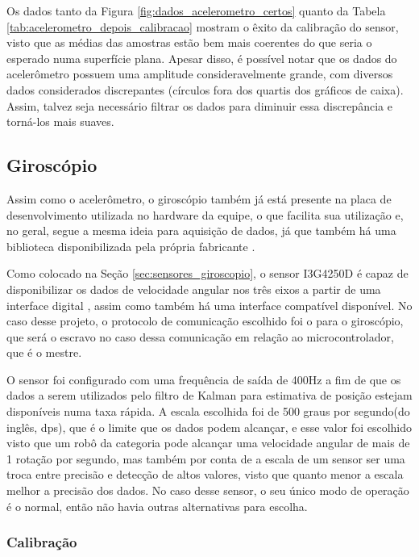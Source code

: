 \documentclass[acronym, symbols, table]{fei}
\begin{document}
					Os dados tanto da Figura \ref{fig:dados_acelerometro_certos} quanto da Tabela \ref{tab:acelerometro_depois_calibracao} mostram o êxito da calibração do sensor, visto que as médias das amostras estão bem mais coerentes do que seria o esperado numa superfície plana. Apesar disso, é possível notar que os dados do acelerômetro possuem uma amplitude consideravelmente grande, com diversos dados considerados discrepantes (círculos fora dos quartis dos gráficos de caixa). Assim, talvez seja necessário filtrar os dados para diminuir essa discrepância e torná-los mais suaves.
			
			\subsection{Giroscópio}
			
				Assim como o acelerômetro, o giroscópio também já está presente na placa de desenvolvimento utilizada no hardware da equipe, o que facilita sua utilização e, no geral, segue a mesma ideia para aquisição de dados, já que também há uma biblioteca disponibilizada pela própria fabricante \cite{gyro_repository}.
				
				Como colocado na Seção \ref{sec:sensores_giroscopio}, o sensor I3G4250D é capaz de disponibilizar os dados de velocidade angular nos três eixos a partir de uma interface digital , assim como também há uma interface  compatível disponível. No caso desse projeto, o protocolo de comunicação escolhido foi o  para o giroscópio, que será o escravo no caso dessa comunicação em relação ao microcontrolador, que é o mestre.
				
				O sensor foi configurado com uma frequência de saída de 400Hz a fim de que os dados a serem utilizados pelo filtro de Kalman para estimativa de posição estejam disponíveis numa taxa rápida. A escala escolhida foi de 500 graus por segundo(do inglês, dps), que é o limite que os dados podem alcançar, e esse valor foi escolhido visto que um robô da categoria  pode alcançar uma velocidade angular de mais de 1 rotação por segundo, mas também por conta de a escala de um sensor ser uma troca entre precisão e detecção de altos valores, visto que quanto menor a escala melhor a precisão dos dados. No caso desse sensor, o seu único modo de operação é o normal, então não havia outras alternativas para escolha.
				
				\subsubsection{Calibração}
				
\end{document}
